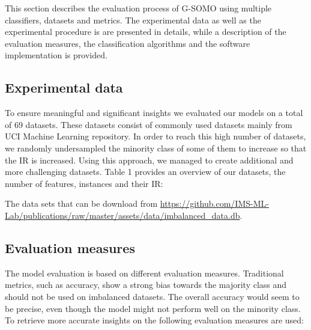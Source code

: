 \documentclass[parskip=full]{scrartcl}
\begin{document}
This section describes the evaluation process of G-SOMO using multiple
classifiers, datasets and metrics. The experimental data as well as the
experimental procedure is are presented in details, while a description of the
evaluation measures, the classification algorithms and the software
implementation is provided.

\subsection{Experimental data}

To ensure meaningful and significant insights we evaluated our models on a total
of 69 datasets. These datasets consist of commonly used datasets mainly from UCI
Machine Learning repository. In order to reach this high number of datasets, we
randomly undersampled the minority class of some of them to increase so that the
IR is increased. Using this approach, we managed to create additional and more
challenging datasets. Table 1 provides an overview of our datasets, the number
of features, instances and their IR:


The data sets that can be download from  
\url{https://github.com/IMS-ML-Lab/publications/raw/master/assets/data/imbalanced_data.db}.

\subsection{Evaluation measures}

The model evaluation is based on different evaluation measures. Traditional
metrics, such as accuracy, show a strong bias towards the majority class and
should not be used on imbalanced datasets. The overall accuracy would seem to be
precise, even though the model might not perform well on the minority class. To
retrieve more accurate insights on the following evaluation measures are used: 
\end{document}
